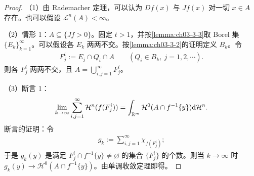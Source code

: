 \documentclass[../../main.tex]{subfiles}%
\begin{document}
\begin{proof}
（1）由 Rademacher 定理，可以认为 $Df(x)$ 与 $Jf(x)$ 对一切 $x\in A$ 存在。也可以假设 $\mathcal{L}^n(A)<\infty$。%

（2）情形 1：$A\subseteq\{Jf>0\}$。固定 $t>1$，并按\cref{lemma:ch03-3-3}取 Borel 集 $\{E_k\}_{k=1}^{\infty}$。可以假设各 $E_k$ 两两不交。按\cref{lemma:ch03-3-2}的证明定义 $B_k$。令%
\begin{align*}
F_j^i:=E_j\cap Q_i\cap A\qquad(Q_i\in B_k,\ j=1,2,\cdots).
\end{align*}
则各 $F_j^i$ 两两不交，且 $A=\bigcup_{i,j=1}^{\infty}F_j^i$。

（3）断言 1：
\begin{align*}
\lim_{k\to\infty}\sum_{i,j=1}^{\infty}\mathcal{H}^n(f(F_j^i))=\int_{\mathbb{R}^m}\mathcal{H}^0(A\cap f^{-1}\{y\})\mathrm{d}\mathcal{H}^n .
\end{align*}
断言的证明：令
\begin{align*}
g_k:=\sum_{i,j=1}^{\infty}\chi_{f(F_j^i)};
\end{align*}
于是 $g_k(y)$ 是满足 $F_j^i\cap f^{-1}\{y\}\neq\varnothing$ 的集合 $\{F_j^i\}$ 的个数。则当 $k\to\infty$ 时 $g_k(y)\to\mathcal{H}^0(A\cap f^{-1}\{y\})$。由单调收敛定理即得。


\end{proof}
\end{document}
